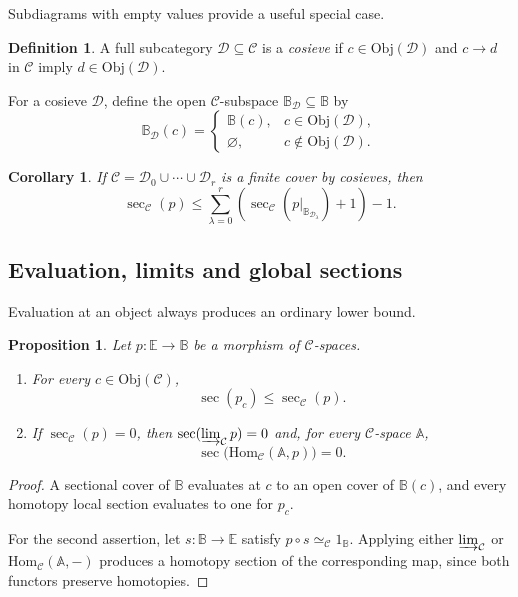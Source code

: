 \documentclass[12pt]{amsart}
\newtheorem{cor}[teo]{Corollary}
\newtheorem{prop}[teo]{Proposition}
\theoremstyle{definition}
\newtheorem{defi}[teo]{Definition}
\theoremstyle{remark}
\numberwithin{figure}{section}%
\newcommand{\CC}{\mathcal{C}}
\newcommand{\DD}{\mathcal{D}}
\newcommand{\Hom}{\mathrm{Hom}}
\newcommand{\Obj}{\mathrm{Obj}}
\newcommand{\Aa}{\mathbb{A}}
\newcommand{\Ee}{\mathbb{E}}
\newcommand{\Bb}{\mathbb{B}}
\begin{document}
Subdiagrams with empty values provide a useful special case.

\begin{defi}
A full subcategory $\DD\subseteq\CC$ is a \emph{cosieve} if
$c\in\Obj(\DD)$ and $c\to d$ in $\CC$ imply
$d\in\Obj(\DD)$.
\end{defi}

For a cosieve $\DD$, define the open $\CC$-subspace
$\Bb_{\DD}\subseteq\Bb$ by
\[
\Bb_{\DD}(c)=
\begin{cases}
\Bb(c),&c\in\Obj(\DD),\\
\varnothing,&c\notin\Obj(\DD).
\end{cases}
\]

\begin{cor}\label{cor:sectional-cosieve-cover}
If $\CC=\DD_0\cup\cdots\cup\DD_r$ is a finite cover by cosieves, then
\[
\sec_{\CC}(p)
\leq
\sum_{\lambda=0}^{r}
\left(
\sec_{\CC}(p|_{\Bb_{\DD_\lambda}})+1
\right)-1.
\]
\end{cor}

\subsection{Evaluation, limits and global sections}

Evaluation at an object always produces an ordinary lower bound.

\begin{prop}
\label{prop:sectional_category_inequality_objectwise}
\label{prop:sectional-zero-functors}
Let $p\colon\Ee\to\Bb$ be a morphism of $\CC$-spaces.
\begin{enumerate}
    \item For every $c\in\Obj(\CC)$,
    \[
    \sec(p_c)\leq\sec_{\CC}(p).
    \]

    \item If $\sec_{\CC}(p)=0$, then
    $\sec(\varinjlim_{\CC}p)=0$ and, for every $\CC$-space $\Aa$,
    \[
    \sec\bigl(\Hom_{\CC}(\Aa,p)\bigr)=0.
    \]
\end{enumerate}
\end{prop}

\begin{proof}
A sectional cover of $\Bb$ evaluates at $c$ to an open cover of
$\Bb(c)$, and every homotopy local section evaluates to one for $p_c$.

For the second assertion, let $s\colon\Bb\to\Ee$ satisfy
$p\circ s\simeq_{\CC}1_{\Bb}$. Applying either
$\varinjlim_{\CC}$ or $\Hom_{\CC}(\Aa,-)$ produces a homotopy section
of the corresponding map, since both functors preserve homotopies.
\end{proof}
\end{document}
